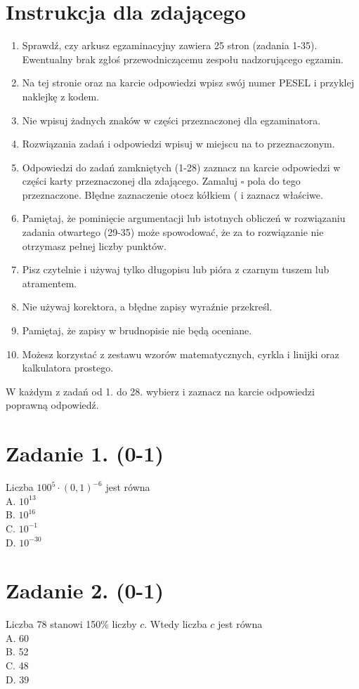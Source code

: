 \documentclass[10pt]{article}
\begin{document}
\section*{Instrukcja dla zdającego}
\begin{enumerate}
  \item Sprawdź, czy arkusz egzaminacyjny zawiera 25 stron (zadania 1-35). Ewentualny brak zgłoś przewodniczącemu zespołu nadzorującego egzamin.
  \item Na tej stronie oraz na karcie odpowiedzi wpisz swój numer PESEL i przyklej naklejkę z kodem.
  \item Nie wpisuj żadnych znaków w części przeznaczonej dla egzaminatora.
  \item Rozwiązania zadań i odpowiedzi wpisuj w miejscu na to przeznaczonym.
  \item Odpowiedzi do zadań zamkniętych (1-28) zaznacz na karcie odpowiedzi w części karty przeznaczonej dla zdającego. Zamaluj \(\square\) pola do tego przeznaczone. Błędne zaznaczenie otocz kółkiem ( i zaznacz właściwe.
  \item Pamiętaj, że pominięcie argumentacji lub istotnych obliczeń w rozwiązaniu zadania otwartego (29-35) może spowodować, że za to rozwiązanie nie otrzymasz pełnej liczby punktów.
  \item Pisz czytelnie i używaj tylko długopisu lub pióra z czarnym tuszem lub atramentem.
  \item Nie używaj korektora, a błędne zapisy wyraźnie przekreśl.
  \item Pamiętaj, że zapisy w brudnopisie nie będą oceniane.
  \item Możesz korzystać z zestawu wzorów matematycznych, cyrkla i linijki oraz kalkulatora prostego.
\end{enumerate}

W każdym z zadań od 1. do 28. wybierz i zaznacz na karcie odpowiedzi poprawną odpowiedź.

\section*{Zadanie 1. (0-1)}
Liczba \(100^{5} \cdot(0,1)^{-6}\) jest równa\\
A. \(10^{13}\)\\
B. \(10^{16}\)\\
C. \(10^{-1}\)\\
D. \(10^{-30}\)

\section*{Zadanie 2. (0-1)}
Liczba 78 stanowi 150\% liczby \(c\). Wtedy liczba \(c\) jest równa\\
A. 60\\
B. 52\\
C. 48\\
D. 39
\end{document}
